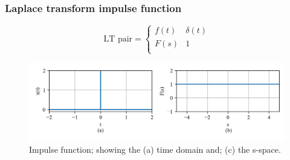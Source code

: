 \documentclass[12pt,letter]{article}
\begin{document}
		\subsubsection{Laplace transform impulse function}

		\begin{equation}
		\text{LT pair} =
			\begin{cases}
			f(t) & \delta(t) \\
			F(s) & 1 \\
			\end{cases}
		\end{equation}

		\begin{figure}[H]
			\centering
			\includegraphics[width=6.5in]{../figures/T_and_S_impulse_function}
			\caption{Impulse function; showing the (a) time domain and; (c) the s-space.}
			\label{fig:T_and_S_impulse_function}
		\end{figure}
\end{document}
